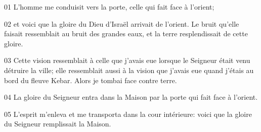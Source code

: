 01 L’homme me conduisit vers la porte, celle qui fait face à l’orient;

02 et voici que la gloire du Dieu d’Israël arrivait de l’orient. Le bruit qu’elle faisait ressemblait au bruit des grandes eaux, et la terre resplendissait de cette gloire. 

03 Cette vision ressemblait à celle que j’avais eue lorsque le Seigneur était venu détruire la ville; elle ressemblait aussi à la vision que j’avais eue quand j’étais au bord du fleuve Kebar. Alors je tombai face contre terre.

04 La gloire du Seigneur entra dans la Maison par la porte qui fait face à l’orient.

05 L’esprit m’enleva et me transporta dans la cour intérieure: voici que la gloire du Seigneur remplissait la Maison.
